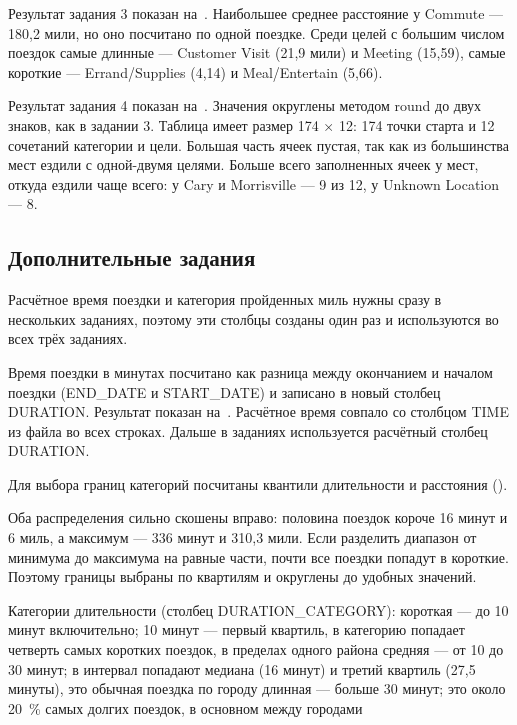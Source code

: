 \documentclass[a4paper,14pt]{extarticle}
\begin{document}

Результат задания 3 показан на~. Наибольшее среднее расстояние у Commute — 180,2 мили, но оно посчитано по одной поездке. Среди целей с большим числом поездок самые длинные — Customer Visit (21,9 мили) и Meeting (15,59), самые короткие — Errand/Supplies (4,14) и Meal/Entertain (5,66).


Результат задания 4 показан на~. Значения округлены методом round до двух знаков, как в задании 3. Таблица имеет размер 174 × 12: 174 точки старта и 12 сочетаний категории и цели. Большая часть ячеек пустая, так как из большинства мест ездили с одной-двумя целями. Больше всего заполненных ячеек у мест, откуда ездили чаще всего: у Cary и Morrisville — 9 из 12, у Unknown Location — 8.


\subsection{Дополнительные задания}

Расчётное время поездки и категория пройденных миль нужны сразу в нескольких заданиях, поэтому эти столбцы созданы один раз и используются во всех трёх заданиях.

Время поездки в минутах посчитано как разница между окончанием и началом поездки (END\_DATE и START\_DATE) и записано в новый столбец DURATION. Результат показан на~. Расчётное время совпало со столбцом TIME из файла во всех строках. Дальше в заданиях используется расчётный столбец DURATION.


Для выбора границ категорий посчитаны квантили длительности и расстояния ().


Оба распределения сильно скошены вправо: половина поездок короче 16 минут и 6 миль, а максимум — 336 минут и 310,3 мили. Если разделить диапазон от минимума до максимума на равные части, почти все поездки попадут в короткие. Поэтому границы выбраны по квартилям и округлены до удобных значений.

Категории длительности (столбец DURATION\_CATEGORY):
\suailist
короткая — до 10 минут включительно; 10 минут — первый квартиль, в категорию попадает четверть самых коротких поездок, в пределах одного района
средняя — от 10 до 30 минут; в интервал попадают медиана (16 минут) и третий квартиль (27,5 минуты), это обычная поездка по городу
длинная — больше 30 минут; это около 20~\% самых долгих поездок, в основном между городами
\end{document}

